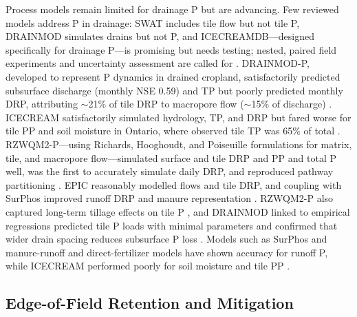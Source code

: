 \documentclass[11pt]{article}
\begin{document}
Process models remain limited for drainage P but are advancing. Few reviewed models address P in
drainage: SWAT includes tile flow but not tile P, DRAINMOD simulates drains but not P, and
ICECREAMDB---designed specifically for drainage P---is promising but needs testing; nested,
paired field experiments and uncertainty assessment are called for
\parencite{Radcliffe2015,Wang2020b}. DRAINMOD-P, developed to represent P dynamics in drained
cropland, satisfactorily predicted subsurface discharge (monthly NSE 0.59) and TP but poorly
predicted monthly DRP, attributing $\sim$21\% of tile DRP to macropore flow ($\sim$15\% of
discharge) \parencite{Askar2021,Askar2021b}. ICECREAM satisfactorily simulated hydrology, TP, and
DRP but fared worse for tile PP and soil moisture in Ontario, where observed tile TP was 65\% of
total \parencite{Qi2018}. RZWQM2-P---using Richards, Hooghoudt, and Poiseuille formulations for
matrix, tile, and macropore flow---simulated surface and tile DRP and PP and total P well, was the
first to accurately simulate daily DRP, and reproduced pathway partitioning
\parencite{Sadhukhan2019,Sadhukhan2019b,Grewal2025}. EPIC reasonably modelled flows and tile DRP,
and coupling with SurPhos improved runoff DRP and manure representation
\parencite{Wang2019}. RZWQM2-P also captured long-term tillage effects on tile P
\parencite{Pan2023}, and DRAINMOD linked to empirical regressions predicted tile P loads with
minimal parameters and confirmed that wider drain spacing reduces subsurface P loss
\parencite{Morrison2013}. Models such as SurPhos and manure-runoff and direct-fertilizer models
have shown accuracy for runoff P, while ICECREAM performed poorly for soil moisture and tile PP
\parencite{Wang2020b}.

\subsection{Edge-of-Field Retention and Mitigation}
\end{document}
